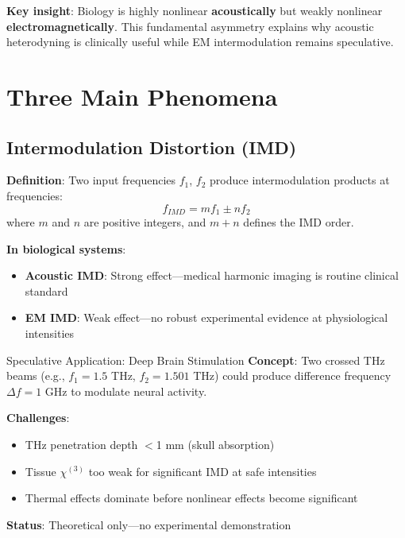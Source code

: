 \begin{keyconcept}
\textbf{Key insight}: Biology is highly nonlinear \textbf{acoustically} but weakly nonlinear \textbf{electromagnetically}. This fundamental asymmetry explains why acoustic heterodyning is clinically useful while EM intermodulation remains speculative.
\end{keyconcept}

\section{Three Main Phenomena}

\subsection{Intermodulation Distortion (IMD)}

\textbf{Definition}: Two input frequencies $f_1$, $f_2$ produce intermodulation products at frequencies:
\begin{equation}
\label{eq:imd-general}
f_{IMD} = mf_1 \pm nf_2
\end{equation}
where $m$ and $n$ are positive integers, and $m + n$ defines the IMD order.

\textbf{In biological systems}:
\begin{itemize}
\item \textbf{Acoustic IMD}: Strong effect---medical harmonic imaging is routine clinical standard
\item \textbf{EM IMD}: Weak effect---no robust experimental evidence at physiological intensities
\end{itemize}

\begin{calloutbox}[colback=black!3!white,colframe=black!50!white]{Speculative Application: Deep Brain Stimulation}
\textbf{Concept}: Two crossed THz beams (e.g., $f_1 = 1.5$ THz, $f_2 = 1.501$ THz) could produce difference frequency $\Delta f = 1$ GHz to modulate neural activity.

\textbf{Challenges}:
\begin{itemize}
\item THz penetration depth $<$1 mm (skull absorption)
\item Tissue $\chi^{(3)}$ too weak for significant IMD at safe intensities
\item Thermal effects dominate before nonlinear effects become significant
\end{itemize}

\textbf{Status}: Theoretical only---no experimental demonstration
\end{calloutbox}

